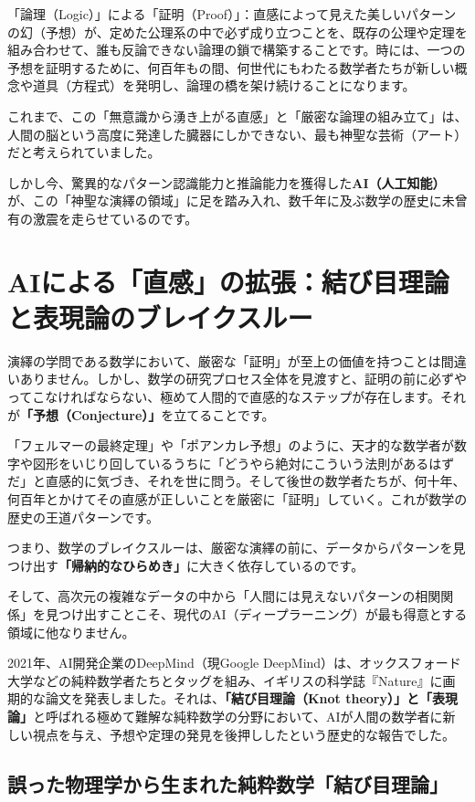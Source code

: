 「論理（Logic）」による「証明（Proof）」：直感によって見えた美しいパターンの幻（予想）が、定めた公理系の中で必ず成り立つことを、既存の公理や定理を組み合わせて、誰も反論できない論理の鎖で構築することです。時には、一つの予想を証明するために、何百年もの間、何世代にもわたる数学者たちが新しい概念や道具（方程式）を発明し、論理の橋を架け続けることになります。

これまで、この「無意識から湧き上がる直感」と「厳密な論理の組み立て」は、人間の脳という高度に発達した臓器にしかできない、最も神聖な芸術（アート）だと考えられていました。

しかし今、驚異的なパターン認識能力と推論能力を獲得した\textbf{AI（人工知能）}が、この「神聖な演繹の領域」に足を踏み入れ、数千年に及ぶ数学の歴史に未曾有の激震を走らせているのです。

\section{AIによる「直感」の拡張：結び目理論と表現論のブレイクスルー}

演繹の学問である数学において、厳密な「証明」が至上の価値を持つことは間違いありません。しかし、数学の研究プロセス全体を見渡すと、証明の前に必ずやってこなければならない、極めて人間的で直感的なステップが存在します。それが\textbf{「予想（Conjecture）」}を立てることです。

「フェルマーの最終定理」や「ポアンカレ予想」のように、天才的な数学者が数字や図形をいじり回しているうちに「どうやら絶対にこういう法則があるはずだ」と直感的に気づき、それを世に問う。そして後世の数学者たちが、何十年、何百年とかけてその直感が正しいことを厳密に「証明」していく。これが数学の歴史の王道パターンです。

つまり、数学のブレイクスルーは、厳密な演繹の前に、データからパターンを見つけ出す\textbf{「帰納的なひらめき」}に大きく依存しているのです。

そして、高次元の複雑なデータの中から「人間には見えないパターンの相関関係」を見つけ出すことこそ、現代のAI（ディープラーニング）が最も得意とする領域に他なりません。

2021年、AI開発企業のDeepMind（現Google DeepMind）は、オックスフォード大学などの純粋数学者たちとタッグを組み、イギリスの科学誌『Nature』に画期的な論文を発表しました。それは、\textbf{「結び目理論（Knot theory）」と「表現論」}と呼ばれる極めて難解な純粋数学の分野において、AIが人間の数学者に新しい視点を与え、予想や定理の発見を後押ししたという歴史的な報告でした。

\subsection{誤った物理学から生まれた純粋数学「結び目理論」}

